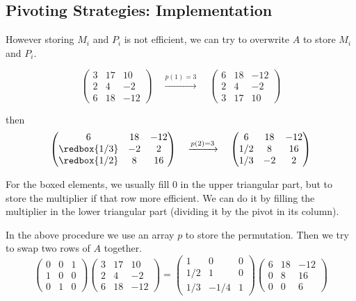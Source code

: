 \subsection{Pivoting Strategies: Implementation}

However storing $M_i$ and $P_i$ is not efficient, we can try to overwrite $A$ to store $M_i$ and $P_i$.

\[
    \begin{pmatrix}
        3 & 17 & 10\\
        2& 4 & -2\\
        6 & 18 & -12
    \end{pmatrix} \quad \xrightarrow{p(1) = 3} \quad \begin{pmatrix}
        6 & 18 & -12 \\
        2 & 4 & -2 \\
        3 & 17 & 10
    \end{pmatrix}
\]

then \[
    \begin{pmatrix}
        6 & 18 & -12 \\
        \redbox{1/3} & -2 & 2 \\
        \redbox{1/2} & 8 & 16
    \end{pmatrix} \quad \xrightarrow{p(2) = 3} \quad \begin{pmatrix}
        6 & 18 & -12 \\
        1/2 & 8 & 16 \\
        1/3 & -2 & 2
    \end{pmatrix}
\]
\begin{remark}
    For the boxed elements, we usually fill $0$ in the upper triangular part, but to store the multiplier if that row more efficient. We can do it by filling the multiplier in the lower triangular part (dividing it by the pivot in its column).
\end{remark}

In the above procedure we use an array $p$ to store the permutation. Then we try to swap two rows of $A$  together. 
\[
    \begin{pmatrix}
        0 & 0 & 1 \\
        1 & 0 & 0 \\
        0 & 1 & 0
    \end{pmatrix} \begin{pmatrix}
        3 & 17 & 10\\
        2& 4 & -2\\
        6 & 18 & -12
    \end{pmatrix} = \begin{pmatrix}
        1 & 0 & 0 \\
        1/2 & 1 & 0 \\
        1/3 & -1/4 & 1
    \end{pmatrix} \begin{pmatrix}
        6 & 18 & -12 \\
        0 & 8 & 16 \\
        0 & 0 & 6
    \end{pmatrix}
\]

